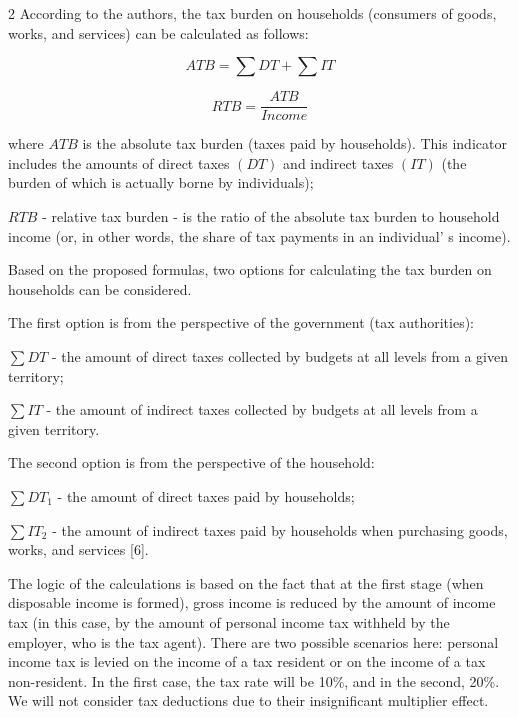 \begin{multicols}{2}
According to the authors, the tax burden on households (consumers of
goods, works, and services) can be calculated as follows:

\begin{equation*}
ATB = \sum DT + \sum IT
\end{equation*}

\begin{equation*}
RTB = \frac{ATB}{Income}
\end{equation*}

where \(ATB\) is the absolute tax burden (taxes paid by households).
This indicator includes the amounts of direct taxes \((DT)\) and
indirect taxes \((IT)\) (the burden of which is actually borne by
individuals);

\(RTB\) - relative tax burden - is the ratio of the absolute tax
burden to household income (or, in other words, the share of tax
payments in an individual' s income).

Based on the proposed formulas, two options for calculating the tax
burden on households can be considered.

The first option is from the perspective of the government (tax
authorities):

\(\sum DT\) - the amount of direct taxes collected by budgets at
all levels from a given territory;

\(\sum IT\) - the amount of indirect taxes collected by budgets at
all levels from a given territory.

The second option is from the perspective of the household:

\(\sum DT_1\) - the amount of direct taxes paid by
households;

\(\sum IT_2\) - the amount of indirect taxes paid
by households when purchasing goods, works, and services {[}6{]}.

The logic of the calculations is based on the fact that at the first
stage (when disposable income is formed), gross income is reduced by the
amount of income tax (in this case, by the amount of personal income tax
withheld by the employer, who is the tax agent). There are two possible
scenarios here: personal income tax is levied on the income of a tax
resident or on the income of a tax non-resident. In the first case, the
tax rate will be 10\%, and in the second, 20\%. We will not consider tax
deductions due to their insignificant multiplier effect.


\end{multicols}

